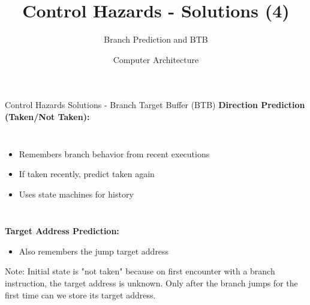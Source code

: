 \documentclass[aspectratio=169,12pt]{beamer}
\title{Control Hazards - Solutions (4)}
\subtitle{Branch Prediction and BTB}
\author{Computer Architecture}
\date{}
\begin{document}
\frame{\titlepage}

\begin{frame}{Control Hazards Solutions - Branch Target Buffer (BTB)}
\textbf{Direction Prediction (Taken/Not Taken):}
\begin{columns}
\begin{itemize}
    \item Remembers branch behavior from recent executions
    \item If taken recently, predict taken again
    \item Uses state machines for history
\end{itemize}

\end{columns}
\vspace{0.5cm}
\textbf{Target Address Prediction:}
\begin{itemize}
    \item Also remembers the jump target address
\end{itemize}

\begin{tcolorbox}[colback=yellow!10]
\small
Note: Initial state is "not taken" because on first encounter with a branch instruction, the target address is unknown. Only after the branch jumps for the first time can we store its target address.
\end{tcolorbox}
\end{frame}
\end{document}
